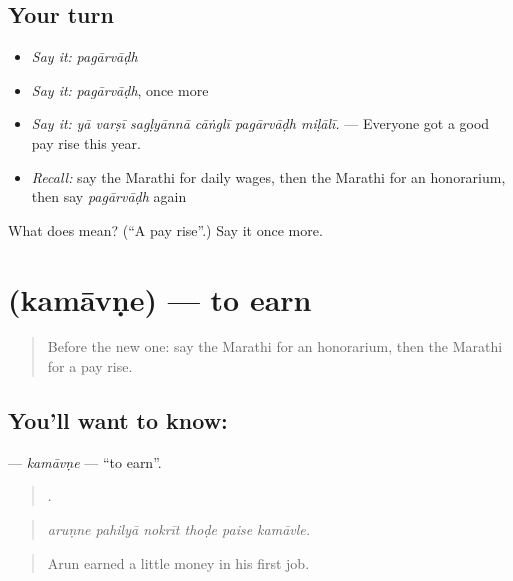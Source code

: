\subsection*{Your turn}
\begin{itemize}
\raggedright
  \item \emph{Say it:} \emph{pagārvāḍh}
  \item \emph{Say it:} \emph{pagārvāḍh}, once more
  \item \emph{Say it:} \emph{yā varṣī sagḷyānnā cāṅglī pagārvāḍh miḷālī.} — Everyone got a good pay rise this year.
  \item \emph{Recall:} say the Marathi for daily wages, then the Marathi for an honorarium, then say \emph{pagārvāḍh} again
\end{itemize}

\begin{tcolorbox}[breakable,colback=teal!4,colframe=teal!35!black,title={Before you move on}]
What does  mean? (\textquotedblleft{}A pay rise\textquotedblright{}.) Say it once more.
\end{tcolorbox}
\section[\texorpdfstring{\mr{कमावणे} (kamāvṇe)}{कमावणे (kamāvṇe)}]{ (kamāvṇe) — to earn}

\label{lesson:MR-C508-kamavne}



\begin{quote}
Before the new one: say the Marathi for an honorarium, then the Marathi for a pay rise.
\end{quote}

\subsection*{You'll want to know: }
\textbf{} — \emph{kamāvṇe} — \textquotedblleft{}to earn\textquotedblright{}.

\begin{quote}
     .
\end{quote}

\begin{quote}
\emph{aruṇne pahilyā nokrīt thoḍe paise kamāvle.}
\end{quote}

\begin{quote}
Arun earned a little money in his first job.
\end{quote}

